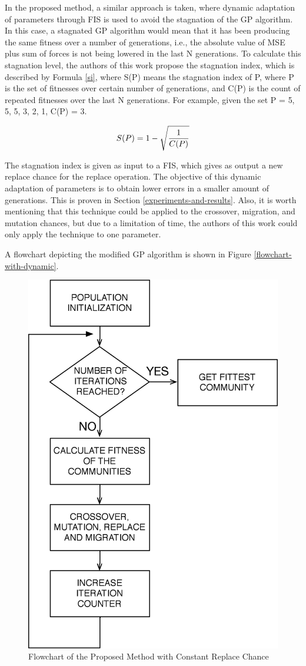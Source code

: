 \documentclass[a4paper,twoside]{article}
\begin{document}
In the proposed method, a similar approach is taken, where dynamic
adaptation of parameters through FIS is used to avoid the stagnation
of the GP algorithm. In this case, a stagnated GP algorithm would mean
that it has been producing the same fitness over a number of
generations, i.e., the absolute value of MSE plus sum of forces is not
being lowered in the last N generations. To calculate this stagnation
level, the authors of this work propose the stagnation index, which is
described by Formula \ref{si}, where S(P) means the stagnation index
of P, where P is the set of fitnesses over certain number of
generations, and C(P) is the count of repeated fitnesses over the last
N generations. For example, given the set P = {5, 5, 5, 3, 2, 1}, C(P)
= 3. 

\begin{equation} \label{si}
S(P) = 1 - \sqrt{1 \over C(P)}
\end{equation}

The stagnation index is given as input to a FIS, which gives as output
a new replace chance for the replace operation. The objective of this
dynamic adaptation of parameters is to obtain lower errors in a
smaller amount of generations. This is proven in Section
\ref{experiments-and-results}. Also, it is worth mentioning that this
technique could be applied to the crossover, migration, and mutation
chances, but due to a limitation of time, the authors of this work
could only apply the technique to one parameter. 

A flowchart depicting the modified GP algorithm is shown in Figure \ref{flowchart-with-dynamic}.

\begin{figure}[h!]
\begin{center}
\includegraphics[width=0.70\columnwidth]{figures/flowchart-without/flowchart-without}
\caption{{\label{flowchart-without-dynamic}Flowchart of the Proposed Method with Constant Replace Chance%
}}
\end{center}
\end{figure}
\end{document}
